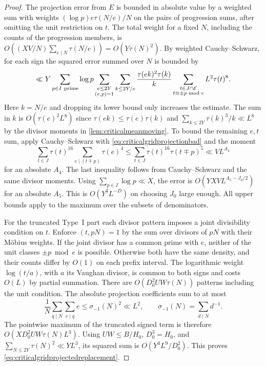 \documentclass[11pt,a4paper]{article}
\numberwithin{equation}{section}
\begin{document}
\begin{proof}
The projection error from $E$ is bounded in
absolute value by a weighted sum with weights
$(\log p)e\tau(N/e)/N$ on the pairs of progression
sums, after omitting the unit restriction on $t$.
The total weight for a fixed $N$, including the
counts of the progression members, is
$O((XV/N)\sum_{e\mid N}\tau(N/e))=O(Y\tau(N)^2)$.
By weighted Cauchy--Schwarz, for each sign the
squared error summed over $N$ is bounded by
\begin{align*}
 \ll Y \sum_{p\in I\ {\rm prime}}\log p
 \sum_{\substack{e\le2Y\\(e,p)=1}}
 \sum_{k\le2Y/e}\frac{\tau(ek)^2\tau(k)}{k}
 \sum_{\substack{t\in J\cap\mathcal E\\t\equiv\pm p\bmod e}}
                               L^2\tau(t)^8 .
\end{align*}
Here $k=N/e$ and dropping its lower bound only
increases the estimate. The sum in $k$ is
$O(\tau(e)^2L^8)$ since $\tau(ek)\le\tau(e)\tau(k)$
and $\sum_{k\le2Y}\tau(k)^3/k\ll L^8$ by the
divisor moments in \cref{lem:criticalmeanmoving}.
To bound the remaining $e,t$ sum, apply
Cauchy--Schwarz with \cref{eq:criticalgridprojectionbad}
and the moment
\[
 \sum_{t\in J}\tau(t)^{16}
            \sum_{e\mid (t\mp p)}\tau(e)^4
     \le\sum_{t\in J}\tau(t)^{16}\tau(t\mp p)^5
     \ll V L^{A_4}
\]
for an absolute $A_4$. The last inequality follows
from Cauchy--Schwarz and the same divisor moments.
Using $\sum_{p\in I}\log p\ll X$, the error is
$O(YXV L^{A_5-J_0/2})$ for an absolute $A_5$.
This is $O(Y^3 L^{-D})$ on choosing $J_0$ large
enough. All upper bounds apply to the maximum
over the subsets of denominators.

For the truncated Type~I part each divisor
pattern imposes a joint divisibility condition
on $t$. Enforce $(t,pN)=1$ by the sum over
divisors of $pN$ with their M\"obius weights.
If the joint divisor has a common prime with
$e$, neither of the unit classes $\pm p\bmod e$
is possible. Otherwise both have the same density,
and their counts differ by $O(1)$ on each prefix
interval. The logarithmic weight $\log(t/a)$,
with $a$ its Vaughan divisor, is common to both
signs and costs $O(L)$ by partial summation.
There are $O(D_0^2UW\tau(N))$ patterns including
the unit condition. The absolute projection
coefficients sum to at most
\[
 \frac1N\sum_{q\mid N}\sum_{e\mid q}e
       \le \sigma_{-1}(N)^2\ll L^2 ,
 \qquad
 \sigma_{-1}(N)=\sum_{d\mid N}d^{-1}.
\]
The pointwise maximum of the truncated signed
term is therefore $O(XD_0^2 UW\tau(N)L^3)$.
Using $UW\le B/H_0$, $D_0^3=H_0$, and
$\sum_{N\le2Y}\tau(N)^2\ll YL^3$, its squared
sum is $O(Y^3L^9/D_0^2)$. This proves
\cref{eq:criticalgridprojectedreplacement}.


\end{proof}
\end{document}
